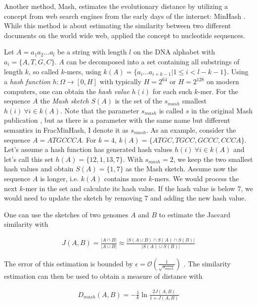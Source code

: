 Another method, Mash, estimates the evolutionary distance by utilizing a concept
from web search engines from the early days of the internet: MinHash
\cite{broderResemblanceContainmentDocuments1998a,ondovMashFastGenome2016}. While
this method is about estimating the similarity between two different documents
on the world wide web,  applied the concept
to nucleotide sequences.

Let $A = a_1 a_2 \dots a_l$ be a string with length $l$ on the DNA alphabet with
$a_i = \{A, T, G, C\}$. $A$ can be decomposed into a set containing all
substrings of length $k$, so called $k$-mers, using $k(A) = \{a_i \dots
a_{i+k-1} | 1 \leq i < l-k-1\}$. Using a \textit{hash function} $h: \Omega
\rightarrow [0, H]$ with typically $H=2^{64}$ or $H=2^{128}$ on modern
computers, one can obtain the \textit{hash value} $h(i)$ for each such $k$-mer.
For the sequence $A$ the \textit{Mash sketch} $S(A)$ is the set of the
$s_{mash}$ smallest $h(i) ~ \forall i \in k(A)$. Note that the parameter
$s_{mash}$ is called $s$ in the original Mash publication
\cite{ondovMashFastGenome2016}, but as there is a parameter  with the same name
but different semantics in FracMinHash, I denote it as $s_{mash}$. As an
example, consider the sequence $A=ATGCCCA$. For $k=4$, $k(A) = \{ATGC, TGCC,
GCCC, CCCA\}$. Let's assume a hash function has generated hash values
$h(i)~\forall i \in k(A)$ and let's call this set $h(A) = \{12, 1, 13, 7\}$.
With $s_{mash}=2$, we keep the two smallest hash values and obtain $S(A) = \{1,
7\}$ as the Mash sketch. Assume now the sequence $A$ is longer, i.e. $k(A)$
contains more $k$-mers. We would process the next $k$-mer in the set and
calculate its hash value. If the hash value is below $7$, we would need to
update the sketch by removing $7$ and adding the new hash value.

One can use the sketches of two genomes $A$ and $B$ to estimate the Jaccard
similarity with 

\begin{align}
  J(A, B) = \frac{|A \cap B|}{|A \cup B|} \approx \frac{|S(A \cup B) \cap S(A) \cap S(B)|}{|S(A) \cup S(B)|}
\end{align}

The error of this estimation is bounded by $\epsilon =
\mathcal{O}(\frac{1}{\sqrt{s_{mash}}})$ \cite{ondovMashFastGenome2016}. The
similarity estimation can then be used to obtain a measure of distance with

\begin{align}
  D_{mash}(A,B) = -\frac{1}{k}\ln{\frac{2J(A,B)}{1+J(A,B)}}
\end{align}

